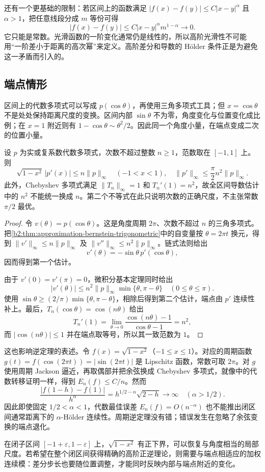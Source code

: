 \ProseParagraphBreak

还有一个更基础的限制：若区间上的函数满足 \(|f(x)-f(y)|\leq C|x-y|^\alpha\) 且 \(\alpha>1\)，把任意线段分成 \(m\) 等份可得
\[
 |f(x)-f(y)|\leq C|x-y|^\alpha m^{1-\alpha}\longrightarrow0.
\]
它只能是常数。光滑函数的一阶变化通常仍是线性的，所以高阶光滑性不可能用“一阶差小于距离的高次幂”来定义。高阶差分和导数的 Hölder 条件正是为避免这一矛盾而引入的。

\subsection{端点情形}
\label{b2:subsec:approximation-endpoints}

区间上的代数多项式可以写成 \(p(\cos\theta)\)，再使用三角多项式工具；但 \(x=\cos\theta\) 不是处处保持距离尺度的变换。区间内部 \(\sin\theta\) 不为零，角度变化与位置变化成比例；在 \(x=1\) 附近则有 \(1-\cos\theta\sim\theta^2/2\)。因此同一个角度小量，在端点变成二次的位置小量。

\begin{proposition}\label{b2:prop:approximation-algebraic-derivative}
设 \(p\) 为实或复系数代数多项式，次数不超过整数 \(n\geq1\)，范数取在 \([-1,1]\) 上。则
\[
 \sqrt{1-x^2}\,|p'(x)|\leq n\|p\|_\infty\quad(-1<x<1),
 \quad \|p'\|_\infty\leq\frac\pi2 n^2\|p\|_\infty.
\]
此外，Chebyshev 多项式满足 \(\|T_n\|_\infty=1\) 和 \(T_n'(1)=n^2\)，故全区间导数估计中的 \(n^2\) 不能统一换成 \(n\)。第二个不等式在此只说明次数的正确尺度，不主张常数 \(\pi/2\) 最优。
\end{proposition}
\begin{proof}
令 \(v(\theta)=p(\cos\theta)\)。这是角度周期 \(2\pi\)、次数不超过 \(n\) 的三角多项式。把\cref{b2:thm:approximation-bernstein-trigonometric}中的自变量按 \(\theta=2\pi t\) 换元，得到 \(\|v'\|_\infty\leq n\|p\|_\infty\) 及 \(\|v''\|_\infty\leq n^2\|p\|_\infty\)。链式法则给出
\[
 v'(\theta)=-\sin\theta\,p'(\cos\theta),
\]
因而得到第一个估计。

由于 \(v'(0)=v'(\pi)=0\)，微积分基本定理同时给出
\[
 |v'(\theta)|\leq n^2\|p\|_\infty\min\{\theta,\pi-\theta\}
 \quad(0\leq\theta\leq\pi).
\]
使用 \(\sin\theta\geq(2/\pi)\min\{\theta,\pi-\theta\}\)，相除后得到第二个估计，端点由 \(p'\) 连续性补上。最后，\(T_n(\cos\theta)=\cos(n\theta)\) 给出
\[
 T_n'(1)=\lim_{\theta\to0}\frac{\cos(n\theta)-1}{\cos\theta-1}=n^2,
\]
而 \(|\cos(n\theta)|\leq1\) 并在端点取等号，所以其一致范数为 \(1\)。
\end{proof}

这也影响逆定理的表述。令 \(f(x)=\sqrt{1-x^2}\)（\(-1\leq x\leq1\)）。对应的周期函数 \(g(t)=f(\cos(2\pi t))=|\sin(2\pi t)|\) 是 Lipschitz 函数，常数可取 \(2\pi\)。对 \(g\) 使用周期 Jackson 逼近，再取偶部并把余弦换成 Chebyshev 多项式，就像中的代数转移证明一样，得到 \(E_n(f)\leq C/n\)。然而
\[
 \frac{|f(1-h)-f(1)|}{h^\alpha}
 =h^{1/2-\alpha}\sqrt{2-h}\longrightarrow\infty
 \quad(\alpha>1/2).
\]
因此即使固定 \(1/2<\alpha<1\)，代数最佳误差 \(E_n(f)=O(n^{-\alpha})\) 也不能推出闭区间通常距离下的 \(\alpha\)-Hölder 连续性。周期逆定理没有错；错误发生在忽略了余弦变换的端点退化。

\ProseParagraphBreak

在闭子区间 \([-1+\varepsilon,1-\varepsilon]\) 上，\(\sqrt{1-x^2}\) 有正下界，可以恢复与角度相当的局部尺度。若希望在整个闭区间获得精确的高阶正逆理论，则需要与端点相适应的加权连续模：差分步长也要随位置调整，才能同时反映内部与端点附近的变化。
